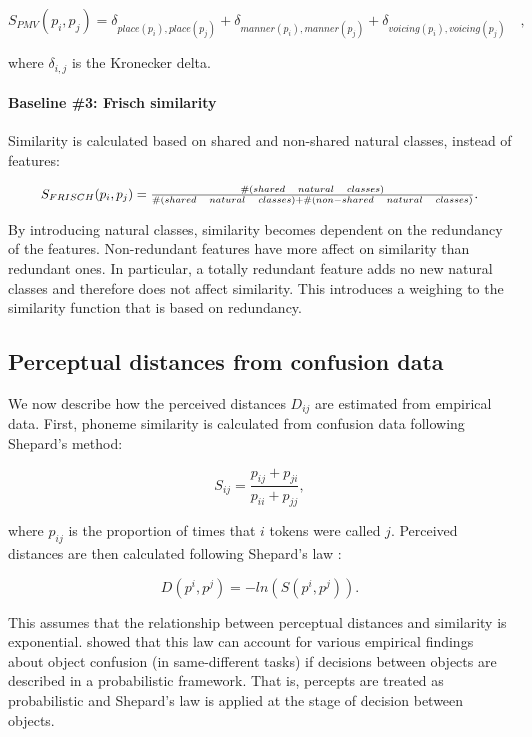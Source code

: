 \begin{equation}
S_{PMV}(p_i, p_j) = \delta_{place(p_i),place(p_j)} + \delta_{manner(p_i),manner(p_j)} + \delta_{voicing(p_i),voicing(p_j)} \quad ,
\end{equation}

where $\delta_{i,j}$ is the Kronecker delta.

\paragraph{Baseline \#3: Frisch similarity \citep{Frisch1997}} Similarity is calculated based on shared and non-shared natural classes, instead of features:
 
\begin{equation}
\resizebox{.9\hsize}{!}{$S_{FRISCH}(p_i, p_j) = \frac{\#(shared \quad natural \quad classes)}{\#(shared \quad natural \quad classes) + \#(non-shared \quad natural \quad classes)}$}.
\end{equation}

By introducing natural classes, similarity becomes dependent on the redundancy of the features. Non-redundant features have more affect on similarity than redundant ones. In particular, a totally redundant feature adds no new natural classes and therefore does not affect similarity. This introduces a weighing to the similarity function that is based on redundancy. \mbox{} \\

\subsection{Perceptual distances from confusion data}
We now describe how the perceived distances ${D_{ij}}$ are estimated from empirical data. First, phoneme similarity is calculated from confusion data following Shepard's method:

\begin{equation}
    S_{ij}=\frac{p_{ij}+p_{ji}}{p_{ii}+p_{jj}},
\end{equation}

where $p_{ij}$ is the proportion of times that $i$ tokens were called $j$. Perceived distances are then calculated following Shepard's law \citep{Shepard1987, Johnson2004}:

\begin{equation}
    D(p^i, p^j) = -ln(S(p^i, p^j)).
\end{equation}

This assumes that the relationship between perceptual distances and similarity is exponential. \citet{Ennis1988} showed that this law can account for various empirical findings about object confusion (in same-different tasks) if decisions between objects are described in a probabilistic framework. That is, percepts are treated as probabilistic and Shepard's law is applied at the stage of decision between objects.

